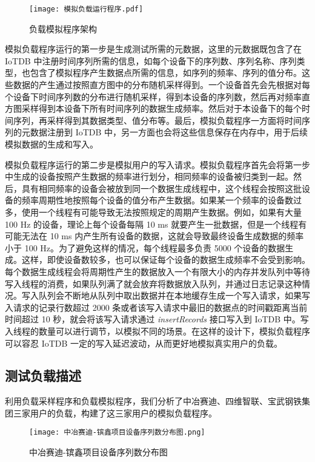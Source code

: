 \begin{figure}
  \centering
  \texttt{[image: 模拟负载运行程序.pdf]}
  \caption{负载模拟程序架构}
  \label{fig:load-simulation-program}
\end{figure}

模拟负载程序运行的第一步是生成测试所需的元数据，这里的元数据既包含了在 IoTDB 中注册时间序列所需的信息，如每个设备下的序列数、序列名称、序列类型，也包含了模拟程序产生数据点所需的信息，如序列的频率、序列的值分布。这些数据的产生通过按照直方图中的分布随机采样得到。一个设备首先会先根据对每个设备下时间序列数的分布进行随机采样，得到本设备的序列数，然后再对频率直方图采样得到本设备下所有时间序列的数据生成频率。然后对于本设备下的每个时间序列，再采样得到其数据类型、值分布等。最后，模拟负载程序一方面将时间序列的元数据注册到 IoTDB 中，另一方面也会将这些信息保存在内存中，用于后续模拟数据的生成和写入。

模拟负载程序运行的第二步是模拟用户的写入请求。模拟负载程序首先会将第一步中生成的设备按照产生数据的频率进行划分，相同频率的设备被归类到一起。然后，具有相同频率的设备会被放到同一个数据生成线程中，这个线程会按照这批设备的频率周期性地按照每个设备的值分布产生数据。如果某一个频率的设备数过多，使用一个线程有可能导致无法按照规定的周期产生数据。例如，如果有大量 100 Hz 的设备，理论上每个设备每隔 10 ms 就要产生一批数据，但是一个线程有可能无法在 10 ms 内产生所有设备的数据，这就会导致最终设备生成数据的频率小于 100 Hz。为了避免这样的情况，每个线程最多负责 5000 个设备的数据生成。这样，即使设备数较多，也可以保证每个设备的数据生成频率不会受到影响。每个数据生成线程会将周期性产生的数据放入一个有限大小的内存并发队列中等待写入线程的消费，如果队列满了就会放弃将数据放入队列，并通过日志记录这种情况。写入队列会不断地从队列中取出数据并在本地缓存生成一个写入请求，如果写入请求的记录行数超过 2000 条或者该写入请求中最旧的数据点的时间戳距离当前时间超过 10 秒，就会将该写入请求通过 \emph{insertRecords} 接口写入到 IoTDB 中。写入线程的数量可以进行调节，以模拟不同的场景。在这样的设计下，模拟负载程序可以容忍 IoTDB 一定的写入延迟波动，从而更好地模拟真实用户的负载。
\subsection{测试负载描述}
利用负载采样程序和负载模拟程序，我们分析了中冶赛迪、四维智联、宝武钢铁集团三家用户的负载，构建了这三家用户的模拟负载程序。
\begin{figure}
  \centering
  \texttt{[image: 中冶赛迪-镔鑫项目设备序列数分布图.png]}
  \caption{中冶赛迪-镔鑫项目设备序列数分布图}
  \label{fig:zysd-bx-device-measurement-count}
\end{figure}

